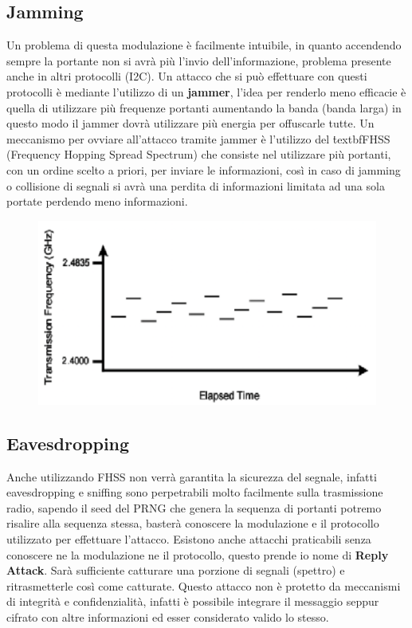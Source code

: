 \subsection{Jamming}
Un problema di questa modulazione è facilmente intuibile, in quanto accendendo sempre la portante non si avrà più l'invio dell'informazione, problema presente anche in altri protocolli (I2C).
Un attacco che si può effettuare con questi protocolli è mediante l'utilizzo di un \textbf{jammer}, l'idea per renderlo meno efficacie è quella di utilizzare più frequenze portanti aumentando la banda (banda larga) in questo modo il jammer dovrà utilizzare più energia per offuscarle tutte.
Un meccanismo per ovviare all'attacco tramite jammer è l'utilizzo del \.textbf{FHSS} (Frequency Hopping Spread Spectrum) che consiste nel utilizzare più portanti, con un ordine scelto a priori, per inviare le informazioni, così in caso di jamming o collisione di segnali si avrà una perdita di informazioni limitata ad una sola portate perdendo meno informazioni.
\begin{figure}[h!]
    \centering
    \includegraphics[width=.8\linewidth]{res/FHSS.png}
    \caption{}
\end{figure}

\subsection{Eavesdropping}
Anche utilizzando FHSS non verrà garantita la sicurezza del segnale, infatti eavesdropping e sniffing sono perpetrabili molto facilmente sulla trasmissione radio, sapendo il seed del PRNG che genera la sequenza di portanti potremo risalire alla sequenza stessa, basterà conoscere la modulazione e il protocollo utilizzato per effettuare l'attacco.
Esistono anche attacchi praticabili senza conoscere ne la modulazione ne il protocollo, questo prende io nome di \textbf{Reply Attack}. Sarà sufficiente catturare una porzione di segnali (spettro) e ritrasmetterle così come catturate.
Questo attacco non è protetto da meccanismi di integrità e confidenzialità, infatti è possibile integrare il messaggio seppur cifrato con altre informazioni ed esser considerato valido lo stesso.

